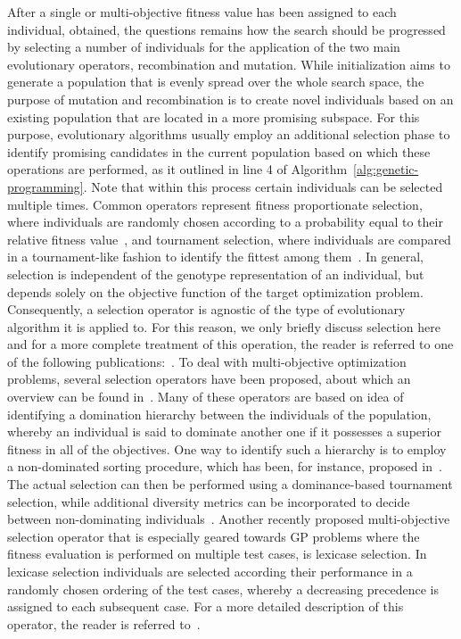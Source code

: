 After a single or multi-objective fitness value has been assigned to each individual, obtained, the questions remains how the search should be progressed by selecting a number of individuals for the application of the two main evolutionary operators, recombination and mutation.
While initialization aims to generate a population that is evenly spread over the whole search space, the purpose of mutation and recombination is to create novel individuals based on an existing population that are located in a more promising subspace.  
For this purpose, evolutionary algorithms usually employ an additional selection phase to identify promising candidates in the current population based on which these operations are performed, as it outlined in line 4 of Algorithm~\ref{alg:genetic-programming}.
Note that within this process certain individuals can be selected multiple times.
Common operators represent fitness proportionate selection, where individuals are randomly chosen according to a probability equal to their relative fitness value~\cite{lipowski2012roulette}, and tournament selection, where individuals are compared in a tournament-like fashion to identify the fittest among them~\cite{fang2010review}.
In general, selection is independent of the genotype representation of an individual, but depends solely on the objective function of the target optimization problem. 
Consequently, a selection operator is agnostic of the type of evolutionary algorithm it is applied to. 
For this reason, we only briefly discuss selection here and for a more complete treatment of this operation, the reader is referred to one of the following publications:~\cite{back1997handbook,beyer2002evolution,goldberg1991comparative}.
To deal with multi-objective optimization problems, several selection operators have been proposed, about which an overview can be found in~\cite{coello2007evolutionary,deb2011multi,deb2015multi}.
Many of these operators are based on idea of identifying a domination hierarchy between the individuals of the population, whereby an individual is said to dominate another one if it possesses a superior fitness in all of the objectives.
One way to identify such a hierarchy is to employ a non-dominated sorting procedure, which has been, for instance, proposed in~\cite{deb2002fast,deb2013evolutionary}.
The actual selection can then be performed using a dominance-based tournament selection, while additional diversity metrics can be incorporated to decide between non-dominating individuals~\cite{coello2007evolutionary}.
Another recently proposed multi-objective selection operator that is especially geared towards GP problems where the fitness evaluation is performed on multiple test cases, is lexicase selection.
In lexicase selection individuals are selected according their performance in a randomly chosen ordering of the test cases, whereby a decreasing precedence is assigned to each subsequent case. 
For a more detailed description of this operator, the reader is referred to~\cite{helmuth2014solving,la2016epsilon}.
 
